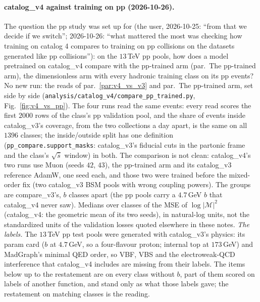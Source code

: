\documentclass[11pt]{article}
\newcommand{\code}[1]{\texttt{#1}}
\begin{document}
\paragraph{catalog\_v4 against training on pp (2026-10-26).}\label{par:v4_vs_pp} The question the pp study was set up for
(the user, 2026-10-25: ``from that we decide if we switch''; 2026-10-26: ``what mattered the most was checking how
training on catalog 4 compares to training on pp collisions on the datasets generated like pp collisions''): on the
$13$\,TeV pp pools, how does a model pretrained on catalog\_v4 compare with the pp-trained arm (par.\ The pp-trained
arm), the dimensionless arm with every hadronic training class on its pp events? No new run: the reads of
par.~\ref{par:v4_vs_v3} and par.\ The pp-trained arm, set side by side (\code{analysis/catalog\_v4/compare\_pp\_trained.py},
Fig.~\ref{fig:v4_vs_pp}). The four runs read the same events: every read scores the first $2000$ rows of the class's
pp validation pool, and the share of events inside catalog\_v3's coverage, from the two collections a day apart, is
the same on all $1396$ classes; the inside/outside split has one definition (\code{pp\_compare.support\_masks}:
catalog\_v3's fiducial cuts in the partonic frame and the class's $\sqrt{\hat s}$ window) in both. The comparison is
not clean: catalog\_v4's two runs use Muon (seeds $42$, $43$), the pp-trained arm and its catalog\_v3 reference AdamW,
one seed each, and those two were trained before the mixed-order fix (two catalog\_v3 BSM pools with wrong coupling
powers). The groups are compare\_v3's, $b$ classes apart (the pp pools carry a $4.7$\,GeV $b$ that catalog\_v4 never
saw). Medians over classes of the MSE of $\log|\mathcal M|^2$ (catalog\_v4: the geometric mean of its two seeds), in
natural-log units, not the standardized units of the validation losses quoted elsewhere in these notes.
\emph{The labels.} The $13$\,TeV pp test pools were generated with catalog\_v3's physics: its param card ($b$ at
$4.7$\,GeV, so a four-flavour proton; internal top at $173$\,GeV) and MadGraph's minimal QED order, so VBF, VBS and the
electroweak-QCD interference that catalog\_v4 includes are missing from their labels. The items below up to the
restatement are on every class without $b$, part of them scored on labels of another function, and stand only as what
those labels gave; the restatement on matching classes is the reading.
\end{document}

